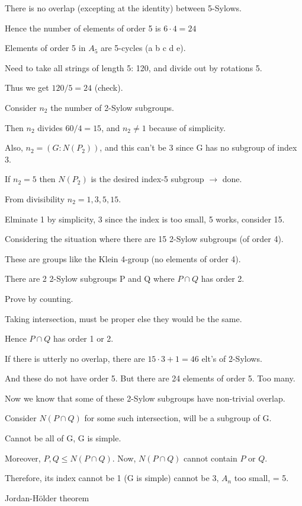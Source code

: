 \documentclass[12pt]{article}
\begin{document}
There is no overlap (excepting at the identity) between 5-Sylows.

Hence the number of elements of order 5 is $6 \cdot 4 = 24$

Elements of order 5 in $A_5$ are 5-cycles (a b c d e).

Need to take all strings of length 5: 120, and divide out by rotations 5.

Thus we get $120 \slash 5 = 24$ (check).

Consider $n_2$ the number of 2-Sylow subgroups.

Then $n_2$ divides $60/4 = 15$, and $n_2 \neq 1$ because of simplicity.

Also, $n_2 = (G : N(P_2))$, and this can't be 3 since G has no subgroup of index 3.

If $n_2 = 5$ then $N(P_2)$ is the desired index-5 subgroup $\to$ done.

From divisibility $n_2 = 1, 3, 5, 15$.

Elminate 1 by simplicity, 3 since the index is too small, 5 works, consider 15.

\noindent
Considering the situation where there are 15 2-Sylow subgroups (of order 4).

These are groups like the Klein 4-group (no elements of order 4).

There are 2 2-Sylow subgroups P and Q where $P \cap Q$ has order 2.

Prove by counting.

Taking intersection, must be proper else they would be the same.

Hence $P \cap Q$ has order 1 or 2.

If there is utterly no overlap, there are $15 \cdot 3 + 1 = 46$ elt's of 2-Sylows.

And these do not have order 5.  But there are 24 elements of order 5.  Too many.

\noindent
Now we know that some of these 2-Sylow subgroups have non-trivial overlap.

Consider $N(P \cap Q)$ for some such intersection, will be a subgroup of G.

Cannot be all of G, G is simple.

Moreover, $P, Q \leq N(P \cap Q)$.  Now, $N(P \cap Q)$ cannot contain $P$ or $Q$.

Therefore, its index cannot be 1 (G is simple) cannot be 3, $A_n$ too small, = 5.

\noindent
Jordan-H\"{o}lder theorem
\end{document}
